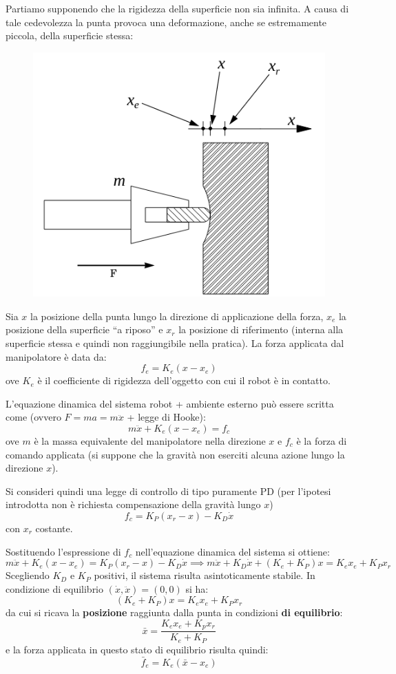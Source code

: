 Partiamo supponendo che la rigidezza della superficie non sia infinita. A causa di tale cedevolezza la punta provoca una deformazione, anche se estremamente piccola, della superficie stessa:

\begin{figure}[H]
	\centering
	\includegraphics[width=0.4\linewidth]{images/compliance_control_1}
	\label{fig:compliancecontrol1}
\end{figure}

Sia $x$ la posizione della punta lungo la direzione di applicazione della forza, $x_e$ la posizione della superficie “a riposo” e $x_r$ la posizione di riferimento (interna alla superficie stessa e quindi non raggiungibile nella pratica).
La forza applicata dal manipolatore è data da:
$$
f_e = K_e(x - x_e)
$$
ove $K_e$ è il coefficiente di rigidezza dell’oggetto con cui il robot è in contatto.

L’equazione dinamica del sistema robot + ambiente esterno può essere scritta come (ovvero $F=ma=m\ddot{x}$ + legge di Hooke):
$$
m\ddot{x} + K_e(x - x_e) = f_c
$$
ove $m$ è la massa equivalente del manipolatore nella direzione $x$ e $f_c$ è la forza di comando applicata (si suppone che la gravità non eserciti alcuna azione lungo la direzione $x$).

Si consideri quindi una legge di controllo di tipo puramente PD (per l’ipotesi introdotta non è richiesta compensazione della gravità lungo $x$)
$$
f_c = K_P(x_r - x) - K_D\dot{x}
$$
con $x_r$ costante.

Sostituendo l’espressione di $f_c$ nell’equazione dinamica del sistema si ottiene:
$$
m\ddot{x} + K_e(x - x_e) = K_P(x_r - x) - K_D\dot{x}
\implies
m\ddot{x} + K_D\dot{x} + (K_e + K_P)x = K_ex_e + K_Px_r
$$
Scegliendo $K_D$ e $K_P$ positivi, il sistema risulta asintoticamente stabile.
In condizione di equilibrio $(\dot{x}, \ddot{x}) = (0,0)$ si ha:
$$
(K_e + K_P)x = K_ex_e + K_Px_r
$$
da cui si ricava la \textbf{posizione} raggiunta dalla punta in condizioni \textbf{di equilibrio}:
$$
\bar{x} = \frac{K_ex_e + K_px_r}{K_e + K_P}
$$
e la forza applicata in questo stato di equilibrio risulta quindi:
$$
\bar{f}_e = K_e(\bar{x} - x_e)
$$

